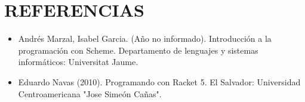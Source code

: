 \documentclass[12pt,letterpaper]{article}
\begin{document}
\section{REFERENCIAS}
\begin{itemize}
\item Andrés Marzal, Isabel Garcia. (Año no informado). Introducción a la programación con Scheme. Departamento de lenguajes y sistemas informáticos: Universitat Jaume.
\item  Eduardo Navas (2010). Programando con Racket 5.
El Salvador: Universidad Centroamericana "Jose Simeón Cañas".
\end{itemize}

\newpage

\clearpage
{}


\end{document}
